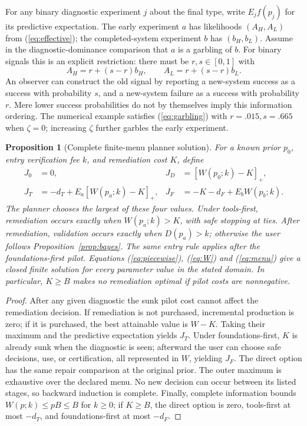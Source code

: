 \documentclass[11pt]{article}
\newtheorem{proposition}{Proposition}
\begin{document}
For any binary diagnostic experiment $j$ about the final type, write $E_j f(p_j)$ for its predictive expectation. The early experiment $a$ has likelihoods $(A_H,A_L)$ from (\ref{eq:effective}); the completed-system experiment $b$ has $(b_H,b_L)$. Assume in the diagnostic-dominance comparison that $a$ is a garbling of $b$. For binary signals this is an explicit restriction: there must be $r,s\in[0,1]$ with
\begin{equation}
 A_H=r+(s-r)b_H,\qquad A_L=r+(s-r)b_L.\label{eq:garbling}
\end{equation}
An observer can construct the old signal by reporting a new-system success as a success with probability $s$, and a new-system failure as a success with probability $r$. Mere lower success probabilities do not by themselves imply this information ordering. The numerical example satisfies (\ref{eq:garbling}) with $r=.015,s=.665$ when $\zeta=0$; increasing $\zeta$ further garbles the early experiment.

\begin{proposition}[Complete finite-menu planner solution]\label{prop:joint}
For a known prior $p_0$, entry verification fee $k$, and remediation cost $K$, define
\begin{align}
 J_0&=0, & J_D&=[W(p_0;k)-K]_+,\\
 J_T&=-d_T+E_a[W(p_a;k)-K]_+, &
 J_F&=-K-d_F+E_bW(p_b;k).\label{eq:menu}
\end{align}
The planner chooses the largest of these four values. Under tools-first, remediation occurs exactly when $W(p_a;k)>K$, with safe stopping at ties. After remediation, validation occurs exactly when $D(p_a)>k$; otherwise the user follows Proposition~\ref{prop:bayes}. The same entry rule applies after the foundations-first pilot. Equations (\ref{eq:piecewise}), (\ref{eq:W}) and (\ref{eq:menu}) give a closed finite solution for every parameter value in the stated domain. In particular, $K\geq B$ makes no remediation optimal if pilot costs are nonnegative.
\end{proposition}
\begin{proof}
After any given diagnostic the sunk pilot cost cannot affect the remediation decision. If remediation is not purchased, incremental production is zero; if it is purchased, the best attainable value is $W-K$. Taking their maximum and the predictive expectation yields $J_T$. Under foundations-first, $K$ is already sunk when the diagnostic is seen; afterward the user can choose safe decisions, use, or certification, all represented in $W$, yielding $J_F$. The direct option has the same repair comparison at the original prior. The outer maximum is exhaustive over the declared menu. No new decision can occur between its listed stages, so backward induction is complete. Finally, complete information bounds $W(p;k)\leq pB\leq B$ for $k\geq0$; if $K\geq B$, the direct option is zero, tools-first at most $-d_T$, and foundations-first at most $-d_F$.
\end{proof}
\end{document}
